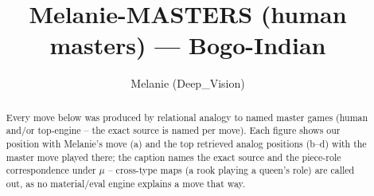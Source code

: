 \documentclass[11pt]{article}
\title{Melanie-MASTERS (human masters) — Bogo-Indian}
\author{Melanie (Deep\_Vision)}
\date{}
\begin{document}
\maketitle

\begin{abstract}Every move below was produced by relational analogy to named master games (human and/or top-engine -- the exact source is named per move). Each figure shows our position with Melanie's move (a) and the top retrieved analog positions (b--d) with the master move played there; the caption names the exact source and the piece-role correspondence under $\mu$ -- cross-type maps (a rook playing a queen's role) are called out, as no material/eval engine explains a move that way.\end{abstract}

\begin{figure}[p]\centering
\begin{subfigure}{0.46\textwidth}\centering
\resizebox{\linewidth}{!}{%
\newchessgame
\chessboard[
  setfen={r1b1k2r/ppppqppp/2n1pn2/8/2PP4/2b2NP1/PP1BPP1P/R2QKB1R w KQkq - 0 7},
  showmover=false,
  pgfstyle=straightmove, color=movearrow, markmove={d2-c3}
]}
\caption{}
\end{subfigure}\hfill
\begin{subfigure}{0.46\textwidth}\centering
\resizebox{\linewidth}{!}{%
\newchessgame
\chessboard[
  setfen={r3kb1r/pppqp1pp/2nppn2/8/1P1P4/2N2b1P/P1P1BPP1/R1BQ1RK1 w kq - 0 11},
  showmover=false,
  pgfstyle=straightmove, color=movearrow, markmove={e2-f3}
]}
\caption{}
\end{subfigure}
\\[4pt]
\begin{subfigure}{0.46\textwidth}\centering
\resizebox{\linewidth}{!}{%
\newchessgame
\chessboard[
  setfen={rn2k2r/1b1p1pp1/pq2pn1p/1p6/3PP3/P2B1N2/1P1bQPPP/R1B1R1K1 w kq - 0 12},
  showmover=false,
  pgfstyle=straightmove, color=movearrow, markmove={c1-d2}
]}
\caption{}
\end{subfigure}\hfill
\begin{subfigure}{0.46\textwidth}\centering
\resizebox{\linewidth}{!}{%
\newchessgame
\chessboard[
  setfen={r1bq1rk1/4bppp/p1n1p3/1pBpP3/5P2/2N2N2/PPPQ2PP/1K1R1B1R b - - 0 12},
  showmover=false,
  pgfstyle=straightmove, color=movearrow, markmove={e7-c5}
]}
\caption{}
\end{subfigure}

\end{figure}
\end{document}
